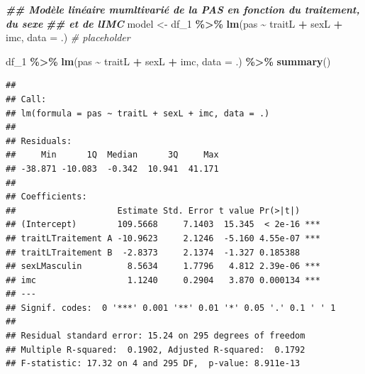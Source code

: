\documentclass[
]{book}
\newenvironment{Shaded}{\begin{snugshade}}{\end{snugshade}}
\newcommand{\AttributeTok}[1]{\textcolor[rgb]{0.13,0.29,0.53}{#1}}
\newcommand{\CommentTok}[1]{\textcolor[rgb]{0.56,0.35,0.01}{\textit{#1}}}
\newcommand{\DocumentationTok}[1]{\textcolor[rgb]{0.56,0.35,0.01}{\textbf{\textit{#1}}}}
\newcommand{\FunctionTok}[1]{\textcolor[rgb]{0.13,0.29,0.53}{\textbf{#1}}}
\newcommand{\NormalTok}[1]{#1}
\newcommand{\OtherTok}[1]{\textcolor[rgb]{0.56,0.35,0.01}{#1}}
\newcommand{\SpecialCharTok}[1]{\textcolor[rgb]{0.81,0.36,0.00}{\textbf{#1}}}
\newcommand{\StringTok}[1]{\textcolor[rgb]{0.31,0.60,0.02}{#1}}
\begin{document}
\begin{Shaded}
\begin{Highlighting}[]
\DocumentationTok{\#\# Modèle linéaire mumltivarié de la PAS en fonction du traitement, du sexe }
\DocumentationTok{\#\# et de l\textquotesingle{}IMC}
\NormalTok{model }\OtherTok{\textless{}{-}}\NormalTok{ df\_1 }\SpecialCharTok{\%\textgreater{}\%} \FunctionTok{lm}\NormalTok{(pas }\SpecialCharTok{\textasciitilde{}}\NormalTok{ traitL }\SpecialCharTok{+}\NormalTok{ sexL }\SpecialCharTok{+}\NormalTok{ imc, }
                     \AttributeTok{data =}\NormalTok{ .) }\CommentTok{\# placeholder}

\NormalTok{df\_1 }\SpecialCharTok{\%\textgreater{}\%} 
  \FunctionTok{lm}\NormalTok{(pas }\SpecialCharTok{\textasciitilde{}}\NormalTok{ traitL }\SpecialCharTok{+}\NormalTok{ sexL }\SpecialCharTok{+}\NormalTok{ imc, }
     \AttributeTok{data =}\NormalTok{ .) }\SpecialCharTok{\%\textgreater{}\%}
  \FunctionTok{summary}\NormalTok{()}
\end{Highlighting}
\end{Shaded}

\begin{verbatim}
## 
## Call:
## lm(formula = pas ~ traitL + sexL + imc, data = .)
## 
## Residuals:
##     Min      1Q  Median      3Q     Max 
## -38.871 -10.083  -0.342  10.941  41.171 
## 
## Coefficients:
##                    Estimate Std. Error t value Pr(>|t|)    
## (Intercept)        109.5668     7.1403  15.345  < 2e-16 ***
## traitLTraitement A -10.9623     2.1246  -5.160 4.55e-07 ***
## traitLTraitement B  -2.8373     2.1374  -1.327 0.185388    
## sexLMasculin         8.5634     1.7796   4.812 2.39e-06 ***
## imc                  1.1240     0.2904   3.870 0.000134 ***
## ---
## Signif. codes:  0 '***' 0.001 '**' 0.01 '*' 0.05 '.' 0.1 ' ' 1
## 
## Residual standard error: 15.24 on 295 degrees of freedom
## Multiple R-squared:  0.1902, Adjusted R-squared:  0.1792 
## F-statistic: 17.32 on 4 and 295 DF,  p-value: 8.911e-13
\end{verbatim}

\begin{Shaded}
\end{Shaded}
\end{document}
